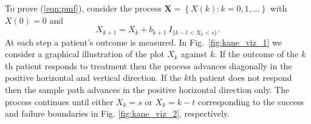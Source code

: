 \documentclass[12pt]{article}
\begin{document}
To prove (\ref{eqn:pmf}), consider the
process $\mathbf{X} = \left\{X(k) : k = 0,1,... \right\}$
with $X(0)=0$ and
\begin{equation*} \label{eqn:proc}
X_{k+1} = X_k + b_{k+1} \ I_{\{ k-t < X_k < s\}}.
\end{equation*}
At each step a patient's outcome is measured. In Fig.~\ref{fig:kane_viz_1} 
we consider a graphical illustration of the plot $X_k$ against
$k$. If the outcome of the $k$th patient responds to treatment then the process 
advances diagonally in the positive horizontal and vertical direction. 
If the $k$th patient does not respond
then the sample path advances in the positive horizontal direction only. The
process continues until either $X_k = s$ or $X_k = k-t$ corresponding to the
success and failure boundaries in Fig. \ref{fig:kane_viz_2}, respectively.
\end{document}
